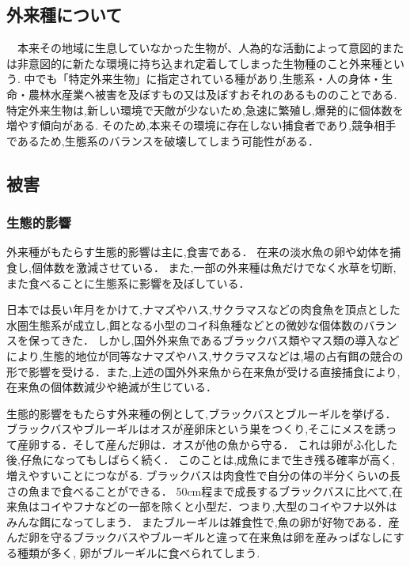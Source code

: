\documentclass[12pt,a4j,titlepage]{ltjsarticle}
\begin{document}
\subsection{外来種について}
　本来その地域に生息していなかった生物が、人為的な活動によって意図的または非意図的に新たな環境に持ち込まれ定着してしまった生物種のこと外来種という.
 中でも「特定外来生物」に指定されている種があり,生態系・人の身体・生命・農林水産業へ被害を及ぼすもの又は及ぼすおそれのあるもののことである.
特定外来生物は,新しい環境で天敵が少ないため,急速に繁殖し,爆発的に個体数を増やす傾向がある.
そのため,本来その環境に存在しない捕食者であり,競争相手であるため,生態系のバランスを破壊してしまう可能性がある．

\subsection{被害}
\subsubsection{生態的影響}
外来種がもたらす生態的影響は主に,食害である．
在来の淡水魚の卵や幼体を捕食し,個体数を激減させている．
また,一部の外来種は魚だけでなく水草を切断,また食べることに生態系に影響を及ぼしている．

日本では長い年月をかけて,ナマズやハス,サクラマスなどの肉食魚を頂点とした水圏生態系が成立し,餌となる小型のコイ科魚種などとの微妙な個体数のバランスを保ってきた．
しかし,国外外来魚であるブラックバス類やマス類の導入などにより,生態的地位が同等なナマズやハス,サクラマスなどは,場の占有餌の競合の形で影響を受ける．また,上述の国外外来魚から在来魚が受ける直接捕食により,在来魚の個体数減少や絶滅が生じている．

生態的影響をもたらす外来種の例として,ブラックバスとブルーギルを挙げる．
ブラックバスやブルーギルはオスが産卵床という巣をつくり,そこにメスを誘って産卵する．そして産んだ卵は．オスが他の魚から守る．
これは卵がふ化した後,仔魚になってもしばらく続く．
このことは,成魚にまで生き残る確率が高く,増えやすいことにつながる.
ブラックバスは肉食性で自分の体の半分くらいの長さの魚まで食べることができる．
50cm程まで成長するブラックバスに比べて,在来魚はコイやフナなどの一部を除くと小型だ．つまり,大型のコイやフナ以外はみんな餌になってしまう．
またブルーギルは雑食性で,魚の卵が好物である．産んだ卵を守るブラックバスやブルーギルと違って在来魚は卵を産みっぱなしにする種類が多く,
卵がブルーギルに食べられてしまう.
\end{document}
